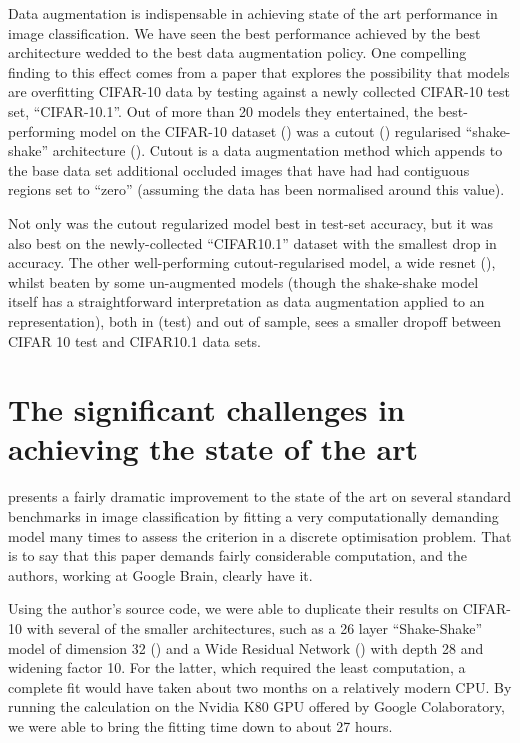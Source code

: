 \documentclass[10pt,twocolumn,letterpaper]{article}
\begin{document}
	Data augmentation is indispensable in achieving state of the art performance in image classification. We have seen the best performance achieved by the best architecture wedded to the best data augmentation policy. One compelling finding to this effect comes from a paper that explores the possibility that models are overfitting CIFAR-10 data\cite{Recht2018} by testing against a newly collected CIFAR-10 test set, ``CIFAR-10.1''. Out of more than 20 models they entertained, the best-performing model on the CIFAR-10 dataset (\cite{Krizhevsky2009}) was a cutout (\cite{Devries2017}) regularised ``shake-shake'' architecture (\cite{Gastaldi2017}). Cutout is a data augmentation method which appends to the base data set additional occluded images that have had had contiguous regions set to ``zero'' (assuming the data has been normalised around this value). 

	Not only was the cutout regularized model best in test-set accuracy, but it was also best on the newly-collected ``CIFAR10.1'' dataset \cite{Recht2018} with the smallest drop in accuracy. The other well-performing cutout-regularised model, a wide resnet (\cite{Zagoruyko2016}), whilst beaten by some un-augmented models (though the shake-shake model itself has a straightforward interpretation as data augmentation applied to an representation), both in (test) and out of sample, sees a smaller dropoff between CIFAR 10 test and CIFAR10.1 data sets. 

\section{The significant challenges in achieving the state of the art}

	\cite{Cubuk2018} presents a fairly dramatic improvement to the state of the art on several standard benchmarks in image classification by fitting a very computationally demanding model many times to assess the criterion in a discrete optimisation problem. That is to say that this paper demands fairly considerable computation, and the authors, working at Google Brain, clearly have it. 

	Using the author's source code, we were able to duplicate their results on CIFAR-10 with several of the smaller architectures, such as a 26 layer ``Shake-Shake'' model of dimension 32 (\cite{Gastaldi2017}) and a Wide Residual Network (\cite{Zagoruyko2016}) with depth 28 and widening factor 10.
	For the latter, which required the least computation, a complete fit would have taken about two months on a relatively modern CPU. By running the calculation on the Nvidia K80 GPU offered by Google Colaboratory, we were able to bring the fitting time down to about 27 hours.
\end{document}
